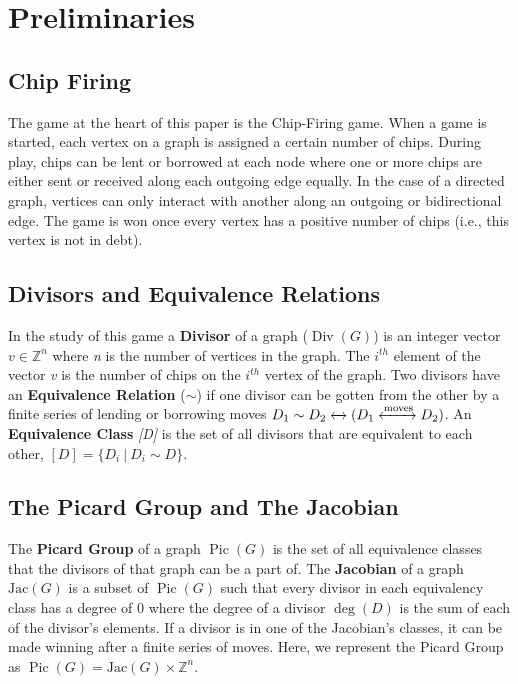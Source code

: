 \documentclass[11pt,reqno]{amsart}
\DeclareMathOperator{\Pic}{Pic}
\DeclareMathOperator{\Div}{Div}
\DeclareMathOperator{\Deg}{deg}
\newcommand{\Jac}{\textrm{Jac}}{}
\theoremstyle{definition}
\theoremstyle{plain}
\begin{document}
\section{Preliminaries}

	\subsection{Chip Firing}
		The game at the heart of this paper is the Chip-Firing game. When a game is started, each vertex on
		a graph is assigned a certain number of chips.  During play, chips can be lent or borrowed at each
		node where one or more chips are either sent or received along each outgoing edge equally.  In the
		case of a directed graph, vertices can only interact with another along an outgoing or
		bidirectional edge.  The game is won once every vertex has a positive number of chips (i.e., this
		vertex is not in debt).

	\subsection{Divisors and Equivalence Relations}
		In the study of this game a \textbf{Divisor} of a graph ($\Div(G)$) is an integer vector $v\in\mathbb{Z}^n$
		where \textit{n} is the number of vertices in the graph.  The $i^{th}$ element of the vector \textit{v}
		is the number of chips on the $i^{th}$ vertex of the graph.  Two divisors have an \textbf{Equivalence Relation}
		($\sim$) if one divisor can be gotten from the other by a finite series of lending or borrowing moves
		$D_1 \sim D_2 \xleftrightarrow{} (D_1 \xleftrightarrow{\text{moves}} D_2)$.  An \textbf{Equivalence Class} \textit{[D]}
		is the set of all divisors that are equivalent to each other, $[D] = \{D_i~|~D_i \sim D\}$.

	\subsection{The Picard Group and The Jacobian}
		The \textbf{Picard Group} of a graph $\Pic(G)$ is the set of all equivalence classes that the
		divisors of that graph can be a  part of. The \textbf{Jacobian} of a graph  $\Jac(G)$ is a subset
		of $\Pic(G)$ such that every divisor in each equivalency class has a degree of $0$ where the
		degree of a divisor $\Deg(D)$ is the sum of each of the divisor's elements.
		If a divisor is in one of the Jacobian's classes, it can be made winning after a finite series of moves.
		Here, we represent the Picard Group as $\Pic(G)=\Jac(G)\times\mathbb{Z}^n$.
\end{document}
